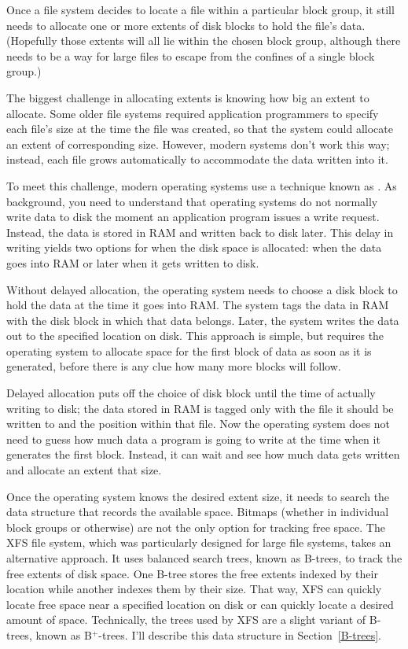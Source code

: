Once a file system decides to locate a file within a particular block
group, it still needs to allocate one or more extents of disk blocks
to hold the file's data.  (Hopefully those extents will all lie within
the chosen block group, although there needs to be a way for large
files to escape from the confines of a single block group.)

The biggest challenge in allocating extents is knowing how big an
extent to allocate.  Some older file systems required application
programmers to specify each file's size at the time the file was
created, so that the system could allocate an extent of corresponding
size.  However, modern systems don't work this way; instead, each file
grows automatically to accommodate the data written into it.

To meet this challenge, modern operating systems use a technique known
as .  As background, you need to
understand that operating systems do not normally write data to disk
the moment an application program issues a write request.  Instead,
the data is stored in RAM and written back to disk later.  This delay
in writing yields two options for when the disk space is allocated:
when the data goes into RAM or later when it gets written to disk.

Without delayed allocation, the operating system needs to choose a
disk block to hold the data at the time it goes into RAM.  The system
tags the data in RAM with the disk block in which that data belongs.  Later,
the system writes the data out to the specified location on disk.
This approach is simple, but requires the operating system to allocate
space for the first block of data as soon as it is generated, before
there is any clue how many more blocks will follow.

Delayed allocation puts off the choice of disk block until the time of
actually writing to disk; the data stored in RAM is tagged only with
the file it should be written to and the position within that file.
Now the operating system does not need to guess how much data a
program is going to write at the time when it generates the first
block.  Instead, it can wait and see how much data gets written and
allocate an extent that size.

Once the operating system knows the desired extent size, it needs to
search the data structure that records the available space.  Bitmaps
(whether in individual block groups or otherwise) are not the only
option for tracking free space.  The XFS file system, which was
particularly designed for large file systems, takes an alternative
approach.  It uses balanced search trees, known as
B-trees, to track the free extents of disk space.  One B-tree
stores the free extents indexed by their location while another
indexes them by their size.  That way, XFS can quickly locate free
space near a specified location on disk or can quickly locate a
desired amount of space.  Technically, the trees used by XFS are a
slight variant of B-trees, known as
B${}^+$-trees.  I'll describe this data
structure in Section~\ref{B-trees}.


